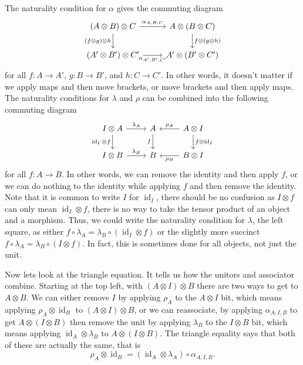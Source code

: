 \documentclass[fleqn]{NotesClass}
\DeclareMathOperator{\id}{id}
\begin{document}
    The naturality condition for \(\alpha\) gives the commuting diagram
    \begin{equation}
        \begin{tikzcd}
            (A \otimes B) \otimes C \arrow[r, "\alpha_{A,B,C}"] \arrow[d, "(f \otimes g) \otimes h"'] & A \otimes (B \otimes C) \arrow[d, "f \otimes (g \otimes h)"]\\
            (A' \otimes B') \otimes C' \arrow[r, "\alpha_{A',B',C'}"'] & A' \otimes (B' \otimes C')
        \end{tikzcd}
    \end{equation}
    for all \(f \colon A \to A'\), \(g \colon B \to B'\), and \(h \colon C \to C'\).
    In other words, it doesn't matter if we apply maps and then move brackets, or move brackets and then apply maps.
    The naturality conditions for \(\lambda\) and \(\rho\) can be combined into the following commuting diagram
    \begin{equation}
        \begin{tikzcd}
            I \otimes A \arrow[r, "\lambda_A"] \arrow[d, "\id_I \otimes f"'] & A \arrow[d, "f"'] & A \otimes I \arrow[l, "\rho_A"'] \arrow[d, "f \otimes \id_{I}"]\\
            I \otimes B \arrow[r, "\lambda_B"] & B & B \otimes I \arrow[l, "\rho_B"]
        \end{tikzcd}
    \end{equation}
    for all \(f \colon A \to B\).
    In other words, we can remove the identity and then apply \(f\), or we can do nothing to the identity while applying \(f\) and then remove the identity.
    Note that it is common to write \(I\) for \(\id_I\), there should be no confusion as \(I \otimes f\) can only mean \(\id_I \otimes f\), there is no way to take the tensor product of an object and a morphism.
    Thus, we could write the naturality condition for \(\lambda\), the left square, as either \(f \circ \lambda_A = \lambda_B \circ (\id_I \otimes f)\) or the slightly more succinct \(f \circ \lambda_A = \lambda_B \circ (I \otimes f)\).
    In fact, this is sometimes done for all objects, not just the unit.

    Now lets look at the triangle equation.
    It tells us how the unitors and associator combine.
    Starting at the top left, with \((A \otimes I) \otimes B\) there are two ways to get to \(A \otimes B\).
    We can either remove \(I\) by applying \(\rho_A\) to the \(A \otimes I\) bit, which means applying \(\rho_A \otimes \id_B\) to \((A \otimes I) \otimes B\), or we can reassociate, by applying \(\alpha_{A,I,B}\) to get \(A \otimes (I \otimes B)\) then remove the unit by applying \(\lambda_B\) to the \(I \otimes B\) bit, which means applying \(\id_A \otimes \lambda_B\) to \(A \otimes (I \otimes B)\).
    The triangle equality says that both of these are actually the same, that is
    \begin{equation}
        \rho_A \otimes \id_B = (\id_A \otimes \lambda_A) \circ \alpha_{A,I,B}.
    \end{equation}
\end{document}
